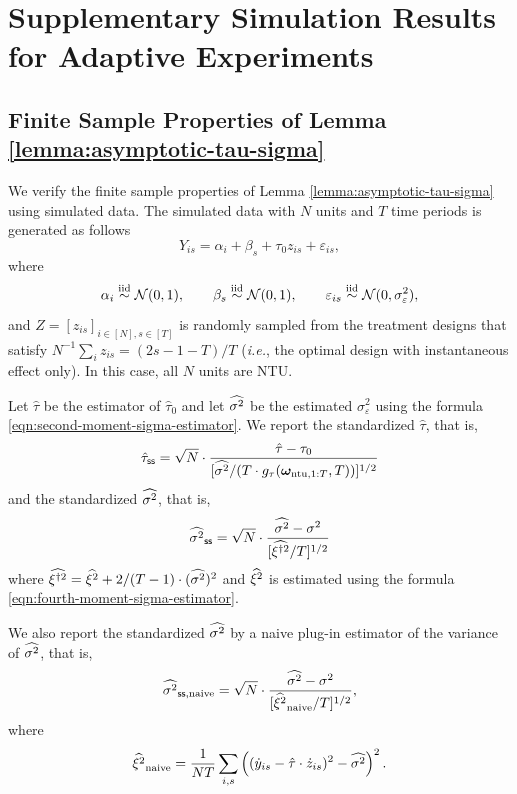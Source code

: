 \section{Supplementary Simulation Results for Adaptive Experiments}\label{sec:additional-simulation-sequential}

\subsection{Finite Sample Properties of Lemma \ref{lemma:asymptotic-tau-sigma}}\label{subsec:finite-sample-lemma}

We verify the finite sample properties of Lemma \ref{lemma:asymptotic-tau-sigma} using simulated data. The simulated data with $N$ units and $T$ time periods is generated as follows 
\[Y_{is} = \alpha_i + \beta_s + \tau_0 z_{is} + \varepsilon_{is},\]
where 
\[\alpha_i \stackrel{\mathrm{iid}}{\sim} \mathcal{N}(0,1), \qquad \beta_s \stackrel{\mathrm{iid}}{\sim} \mathcal{N}(0,1), \qquad \varepsilon_{is} \stackrel{\mathrm{iid}}{\sim} \mathcal{N}(0,\sigma^2_\varepsilon),  \]
and $Z = [z_{is}]_{i\in[N],s\in [T]}$ is randomly sampled from the treatment designs that satisfy $N^{-1} \sum_{i} z_{is} = {(2s - 1 - T)}/{T}$ ({\it i.e.}, the optimal design with instantaneous effect only). In this case, all $N$ units are NTU. 

Let $\hat{\tau}$ be the \within estimator of $\hat{\tau}_0$ and let $\widehat{\sigma^2}$ be the estimated $\sigma_\varepsilon^2$ using the formula \eqref{eqn:second-moment-sigma-estimator}. We report the standardized $\hat{\tau}$, that is, 
\[ \hat{\tau}_{\mathsf{ss}} =  \sqrt{N} \cdot \frac{\hat{\tau} - \tau_0}{[\widehat{\sigma^2} /(T \cdot g_\tau(\bm{\omega}_{\mathrm{ntu}, 1:T}, T))]^{1/2}} \]
and the standardized $\widehat{\sigma^2}$, that is, \[\widehat{\sigma^2}_{\mathsf{ss}} =  \sqrt{N} \cdot \frac{\widehat{\sigma^2} - \sigma^2}{[\widehat{\xi^{\dagger 2}}/T]^{1/2}} \]
where $\widehat{\xi^{\dagger 2}} = \widehat{\xi^2} + {2}/{(T-1)} \cdot (\widehat{\sigma^2})^2$ and $\widehat{\xi^2}$ is estimated using the formula \eqref{eqn:fourth-moment-sigma-estimator}. 

We also report the standardized $\widehat{\sigma^2}$ by a naive plug-in estimator of the variance of $\widehat{\sigma^2}$, that is, 
\[\widehat{\sigma^2}_{\mathsf{ss},\mathrm{naive}} =  \sqrt{N} \cdot \frac{\widehat{\sigma^2} - \sigma^2}{[\widehat{\xi^2}_{\mathrm{naive}}/T]^{1/2}}, \]
where 
\[\widehat{\xi^2}_{\mathrm{naive}} = \frac{1}{NT} \sum_{i,s} \left( (\dot{y}_{is} - \hat{\tau} \cdot \dot{z}_{is})^2 - \widehat{\sigma^2} \right)^2. \]

